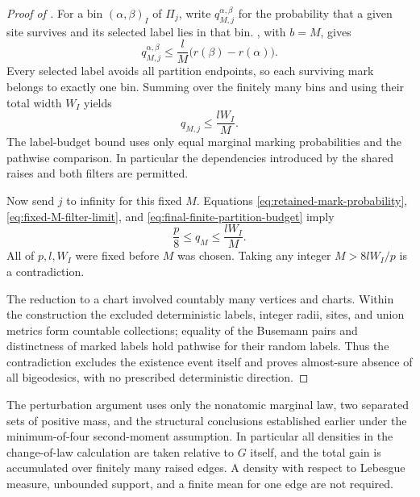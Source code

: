\begin{proof}[Proof of ]
For a bin $(\alpha,\beta)_I$ of $\Pi_j$, write $q_{M,j}^{\alpha,\beta}$
for the probability that a given site survives and its selected label
lies in that bin.  , with $b=M$, gives
\[
 q_{M,j}^{\alpha,\beta}
 \leq\frac lM\bigl(r(\beta)-r(\alpha)\bigr).
\]
Every selected label avoids all partition endpoints, so each surviving
mark belongs to exactly one bin.  Summing over the finitely many bins
and using their total width $W_I$ yields
\begin{equation}\label{eq:final-finite-partition-budget}
 q_{M,j}\leq\frac{lW_I}{M}.
\end{equation}
The label-budget bound uses only equal marginal marking probabilities
and the pathwise comparison.  In particular the dependencies introduced
by the shared raises and both filters are permitted.

Now send $j$ to infinity for this fixed $M$.  Equations
\eqref{eq:retained-mark-probability}, \eqref{eq:fixed-M-filter-limit},
and \eqref{eq:final-finite-partition-budget} imply
\[
 \frac p8\leq q_M\leq\frac{lW_I}{M}.
\]
All of $p,l,W_I$ were fixed before $M$ was chosen.  Taking any integer
$M>8lW_I/p$ is a contradiction.

The reduction to a chart involved countably many vertices and charts.
Within the construction the excluded deterministic labels, integer
radii, sites, and union metrics form countable collections; equality of
the Busemann pairs and distinctness of marked labels hold pathwise for
their random labels.  Thus the contradiction excludes the existence
event itself and proves almost-sure absence of all bigeodesics, with no
prescribed deterministic direction.
\end{proof}

The perturbation argument uses only the nonatomic marginal law, two
separated sets of positive mass, and the structural conclusions
established earlier under the minimum-of-four second-moment assumption.
In particular all densities in the change-of-law calculation are taken
relative to $G$ itself, and the total gain is accumulated over finitely
many raised edges.  A density with respect to Lebesgue measure,
unbounded support, and a finite mean for one edge are not required.
